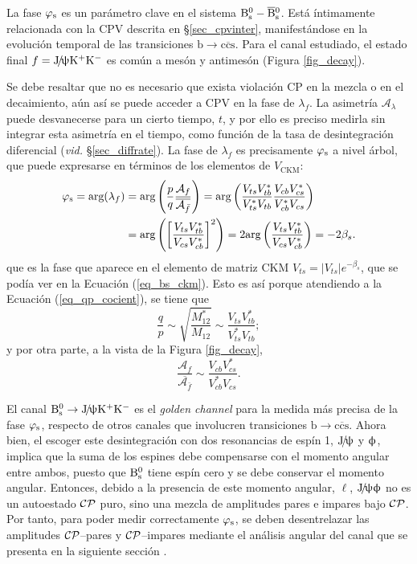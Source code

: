 La fase $\varphi_{\text{s}}$ es un parámetro clave en el sistema $\text{B}{}_{\text{s}}^{\text{0}} - \overline{\text{B}}{}_{\text{s}}^{\text{0}}$. Está íntimamente relacionada con la CPV descrita en \S \ref{sec_cpvinter}, manifestándose  en la evolución temporal de las transiciones $\mathrm{b \rightarrow c \overline{c}{s}}$. Para el canal estudiado, el estado final $f=\text{J}\!/\!\uppsi \text{K}{}^{+}\text{K}{}^{-}$ es común a mesón y antimesón (Figura \ref{fig_decay}). 

Se debe resaltar que no es necesario que exista violación CP en la mezcla o en el decaimiento, aún así se puede acceder a CPV en la fase de $\lambda_f$. La asimetría $\mathscr{A}_{\lambda}$ puede desvanecerse para un cierto tiempo, $t$, y por ello es preciso medirla sin integrar esta asimetría en el tiempo, como función de la tasa de desintegración diferencial (\emph{vid.} \S \ref{sec_diffrate}). La fase de $\lambda_f$ es precisamente $\varphi_{\text{s}}$ \color{vero} a nivel árbol, \color{norm} que puede expresarse en términos de los elementos de $V_{\text{CKM}}$:
\begin{equation}
\begin{split}
  \varphi_{\text{s}} = \text{arg} (\lambda_f) & =  \text{arg}\left(\frac{p}{q}  \frac{\mathcal{A}_f}{\overline{\mathcal{A}_{\bar{f}}}}\right) =   \text{arg}\left(\frac{V_{ts}V_{tb}^*}{V_{ts}^*V_{tb}} \frac{V_{cb}V_{cs}^*}{V_{cb}^*V_{cs}} \right) \\ &=   \text{arg} \left(  \left[ \frac{V_{ts} V_{tb}^*}{V_{cs} V_{cb}^*}  \right]^2  \right) = 2 \text{arg} \left(   \frac{V_{ts} V_{tb}^*}{V_{cs} V_{cb}^*}    \right)  =  - 2\beta_s.
\end{split}
\end{equation}
que es la fase que aparece en el elemento de matriz \textsc{CKM} $V_{ts} = |V_{ts}| e^{- \beta_s}$, que se podía ver en la Ecuación (\ref{eq_bs_ckm}).
%
Esto es así porque atendiendo a la Ecuación (\ref{eq_qp_cocient}), se tiene que
\[\frac{q}{p} \sim \sqrt{\frac {M_{12}^*} {M_{12}} } \sim \frac{V_{ts}V_{tb}^*}{V_{ts}^*V_{tb}}; \]
y por otra parte, a la vista de la Figura \ref{fig_decay},
\[\frac{\mathcal{A}_f}{\overline{\mathcal{A}_{\bar{f}}}} \sim \frac{V_{cb}V_{cs}^*}{V_{cb}^*V_{cs}}.\]



El canal $\text{B}{}_{\text{s}}^{\text{0}} \rightarrow \text{J}\!/\!\uppsi \text{K}{}^{+}\text{K}{}^{-}$ es el \emph{golden channel} para la medida más precisa de la fase $\varphi_{\text{s}}$, respecto de otros canales que involucren transiciones $\mathrm{b \rightarrow c\overline{c}s}$. Ahora bien, el escoger este desintegración con dos resonancias de \color{vero} espín 1, \color{norm} $\text{J}\!/\!\uppsi$ y $\upphi$, implica que la suma de los espines debe compensarse con el momento angular entre ambos, puesto que $\text{B}{}_{\text{s}}^{\text{0}}$ tiene espín cero y se debe conservar el momento angular. Entonces, debido a la presencia de este momento angular, $\ell$, $\text{J}\!/\!\uppsi \upphi$ no es un autoestado $\mathcal{CP}$ puro, sino una mezcla de amplitudes pares e impares bajo $\mathcal{CP}$. Por tanto, para poder medir correctamente $\varphi_{\text{s}}$, se deben desentrelazar las amplitudes $\mathcal{CP}$--pares y $\mathcal{CP}$--impares mediante el análisis angular del canal que se presenta en la siguiente sección \cite{paperPhis}.



